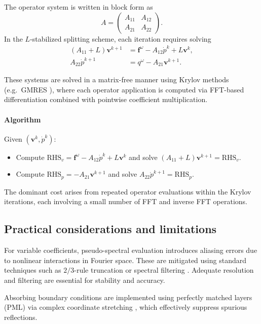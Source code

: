\documentclass[pdflatex,sn-mathphys-num]{sn-jnl}
\theoremstyle{thmstyleone}%
\theoremstyle{thmstyletwo}%
\theoremstyle{thmstylethree}%
\theoremstyle{definition}
\begin{document}
	The operator system is written in block form as
	\[
	A = \begin{pmatrix} A_{11} & A_{12} \\ A_{21} & A_{22} \end{pmatrix}.
	\]
	In the $L$-stabilized splitting scheme, each iteration requires solving
	\[
	\begin{aligned}
		(A_{11}+L)\mathbf{v}^{k+1} &= \mathbf{f}^\omega - A_{12}\dot{p}^k + L \mathbf{v}^k,\\
		A_{22}\dot{p}^{k+1} &= q^{\omega}-A_{21}\mathbf{v}^{k+1}.
	\end{aligned}
	\]
	
	These systems are solved in a matrix-free manner using Krylov methods (e.g.\ GMRES \cite{saad1986gmres}), where each operator application is computed via FFT-based differentiation combined with pointwise coefficient multiplication.
	
	\paragraph{Algorithm}
	Given $(\mathbf{v}^k,\dot{p}^k)$:
	\begin{itemize}
		\item Compute $\text{RHS}_v = \mathbf{f}^\omega - A_{12}\dot{p}^k + L\mathbf{v}^k$ and solve $(A_{11}+L)\mathbf{v}^{k+1} = \text{RHS}_v$.
		\item Compute $\text{RHS}_p = -A_{21}\mathbf{v}^{k+1}$ and solve $A_{22}\dot{p}^{k+1} = \text{RHS}_p$.
	\end{itemize}
	
	The dominant cost arises from repeated operator evaluations within the Krylov iterations, each involving a small number of FFT and inverse FFT operations.
	
	\subsection{Practical considerations and limitations}
	
	For variable coefficients, pseudo-spectral evaluation introduces aliasing errors due to nonlinear interactions in Fourier space. These are mitigated using standard techniques such as $2/3$-rule truncation or spectral filtering \cite{Fornberg1987,Kosloff1982}. Adequate resolution and filtering are essential for stability and accuracy.
	
	Absorbing boundary conditions are implemented using perfectly matched layers (PML) via complex coordinate stretching \cite{berenger1994,chew1997}, which effectively suppress spurious reflections.
	
\end{document}
